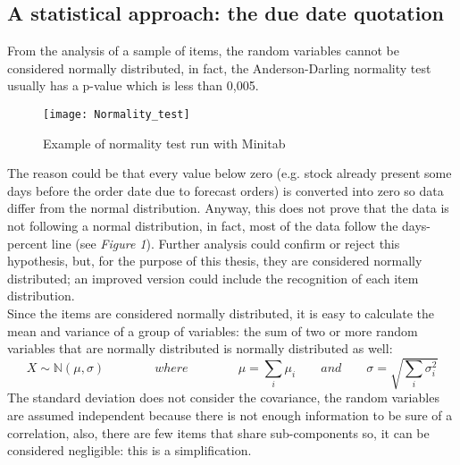 \documentclass[a4paper,12pt]{article}
\begin{document}
\subsection{A statistical approach: the due date quotation}
From the analysis of a sample of items, the random variables cannot be considered normally distributed, in fact, the Anderson-Darling normality test usually has a p-value which is less than 0,005.\\
\begin{figure}[H]
	\begin{center}
		\texttt{[image: Normality\_test]}
		\caption{Example of normality test run with Minitab\textsuperscript{\textregistered}}
	\end{center}
\end{figure}
The reason could be that every value below zero (e.g. stock already present some days before the order date due to forecast orders) is converted into zero so data differ from the normal distribution. Anyway, this does not prove that the data is not following a normal distribution, in fact, most of the data follow the days-percent line (see \textit{Figure 1}). Further analysis could confirm or reject this hypothesis, but, for the purpose of this thesis, they are considered normally distributed; an improved version could include the recognition of each item distribution.\\
Since the items are considered normally distributed, it is easy to calculate the mean and variance of a group of variables: the sum of two or more random variables that are normally distributed is normally distributed as well:
\begin{equation*}
X \sim \mathbb{N}(\mu, \sigma)		\qquad \qquad where \qquad \qquad		\mu = \sum_{i} \mu_{i} 		 \qquad and\qquad			\sigma = \sqrt{\sum_{i} \sigma_{i}^{2}}
\end{equation*}
The standard deviation does not consider the covariance, the random variables are assumed independent because there is not enough information to be sure of a correlation, also, there are few items that share sub-components so, it can be considered negligible: this is a simplification. \\
\end{document}
